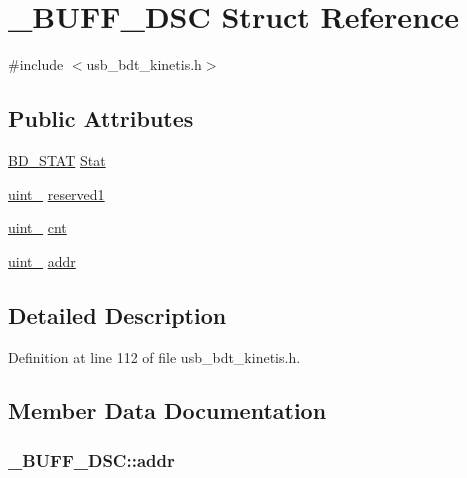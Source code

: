 \hypertarget{struct___b_u_f_f___d_s_c}{}\section{\+\_\+\+B\+U\+F\+F\+\_\+\+D\+SC Struct Reference}
\label{struct___b_u_f_f___d_s_c}


{\ttfamily \#include $<$usb\+\_\+bdt\+\_\+kinetis.\+h$>$}

\subsection*{Public Attributes}
\begin{DoxyCompactItemize}
\item 
\hyperlink{usb__bdt__kinetis_8h_a669828f95c5a1f57f02f0a5481368db6}{B\+D\+\_\+\+S\+T\+AT} \hyperlink{struct___b_u_f_f___d_s_c_ae0eb7baa3083e9dab5b9d40eb2afb51c}{Stat}
\item 
\hyperlink{types_8h_ad3209046c23f739a81581c10a4be7d92}{uint\+\_} \hyperlink{struct___b_u_f_f___d_s_c_ad5826cefe57fbcea9f3c3624d5a67b05}{reserved1}
\item 
\hyperlink{types_8h_a8ab774e38493b7c7e4d8edfd5004e66b}{uint\+\_} \hyperlink{struct___b_u_f_f___d_s_c_a4c16226928723a914f57268c1b075f22}{cnt}
\item 
\hyperlink{types_8h_a5532400b872b4aa84e54335bf458a318}{uint\+\_} \hyperlink{struct___b_u_f_f___d_s_c_ae8eb3e22a4fd1abfdf65387a319aa94d}{addr}
\end{DoxyCompactItemize}


\subsection{Detailed Description}


Definition at line 112 of file usb\+\_\+bdt\+\_\+kinetis.\+h.



\subsection{Member Data Documentation}
\subsubsection[{\texorpdfstring{addr}{addr}}]{ \+\_\+\+B\+U\+F\+F\+\_\+\+D\+S\+C\+::addr}\hypertarget{struct___b_u_f_f___d_s_c_ae8eb3e22a4fd1abfdf65387a319aa94d}{}\label{struct___b_u_f_f___d_s_c_ae8eb3e22a4fd1abfdf65387a319aa94d}


